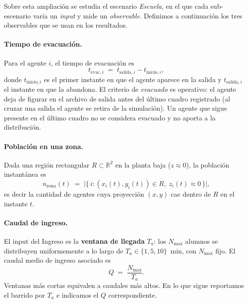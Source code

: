 \documentclass[11pt,a4paper]{article}
\begin{document}
Sobre esta ampliación se estudia el escenario \emph{Escuela}, en el que cada sub-escenario varía
un \emph{input} y mide un \emph{observable}. Definimos a continuación los tres observables que se
usan en los resultados.

\paragraph{Tiempo de evacuación.}
Para el agente $i$, el tiempo de evacuación es
\begin{equation}
  t_{\text{evac},i} \;=\; t_{\text{salida},i} - t_{\text{inicio},i},
  \label{eq:tevac}
\end{equation}
donde $t_{\text{inicio},i}$ es el primer instante en que el agente aparece en la salida y
$t_{\text{salida},i}$ el instante en que la abandona. El criterio de \emph{evacuado} es
operativo: el agente deja de figurar en el archivo de salida antes del último cuadro
registrado (al cruzar una salida el agente se retira de la simulación). Un agente que sigue
presente en el último cuadro no se considera evacuado y no aporta a la distribución.

\paragraph{Población en una zona.}
Dada una región rectangular $R \subset \mathbb{R}^2$ en la planta baja ($z\approx 0$), la
población instantánea es
\begin{equation}
  n_{\text{zona}}(t) \;=\; \bigl|\{\, i : (x_i(t), y_i(t)) \in R,\; z_i(t) \approx 0 \,\}\bigr|,
  \label{eq:nzona}
\end{equation}
es decir la cantidad de agentes cuya proyección $(x,y)$ cae dentro de $R$ en el instante $t$.

\paragraph{Caudal de ingreso.}
El input del Ingreso es la \textbf{ventana de llegada} $T_a$: los $N_{\max}$ alumnos se
distribuyen uniformemente a lo largo de $T_a \in \{1,5,10\}$~\si{\minute}, con $N_{\max}$ fijo. El
caudal medio de ingreso asociado es
\begin{equation}
  Q \;=\; \frac{N_{\max}}{T_a}.
  \label{eq:caudal}
\end{equation}
Ventanas más cortas equivalen a caudales más altos. En lo que sigue reportamos el barrido por
$T_a$ e indicamos el $Q$ correspondiente.
\end{document}
